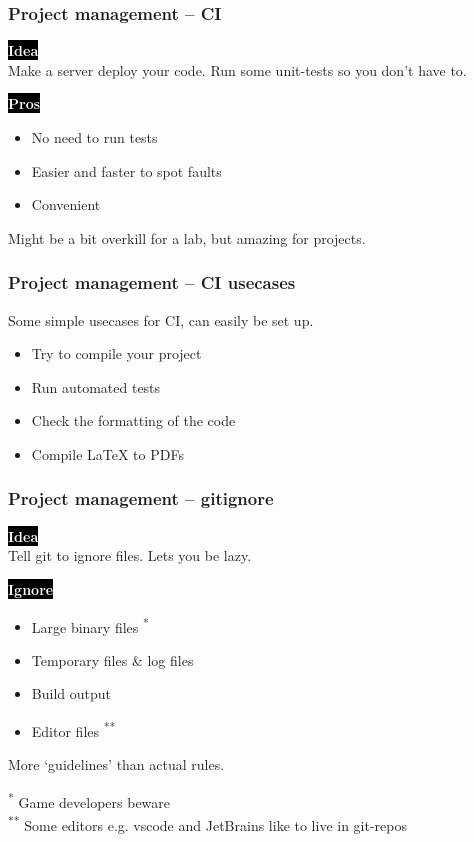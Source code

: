 \documentclass{beamer}
\newcommand{\keyword}[1]{\hspace{-1.0em}\colorbox{black}{\textcolor{white}{\textbf{#1}\vphantom{Ep}}}\vspace{0.2em}} %
\begin{document}
\begin{frame}[fragile]
  \frametitle{Project management -- CI} %

  \keyword{Idea} \\
  Make a server deploy your code. Run some unit-tests so you don't have to.
  \vspace{1em}

  \keyword{Pros}
  \begin{itemize}[<+->]
    \item No need to run tests
    \item Easier and faster to spot faults
    \item Convenient
  \end{itemize}
  \vspace{1em}

  \pause
  Might be a bit overkill for a lab, but amazing for projects.

\end{frame}

\begin{frame}[fragile]
  \frametitle{Project management -- CI usecases} %

  Some simple usecases for CI, can easily be set up.
  \vspace{1em}
  \begin{itemize}
    \item Try to compile your project
    \item Run automated tests
    \item Check the formatting of the code
    \item Compile \LaTeX{} to PDFs
  \end{itemize}

\end{frame}

\begin{frame}[fragile]
  \frametitle{Project management -- gitignore}

  \keyword{Idea} \\
  Tell git to ignore files. Lets you be lazy.
  \vspace{1em}

  \keyword{Ignore}
  \begin{itemize}[<+->]
    \item Large binary files \textsuperscript{*}
    \item Temporary files \& log files
    \item Build output
    \item Editor files \textsuperscript{**}
  \end{itemize}
  \vspace{1em}

  \pause
  More `guidelines' than actual rules.
  \vspace{1em}
  \pause

  \small \textsuperscript{*} Game developers beware \\
  \small \textsuperscript{**} Some editors e.g. vscode and JetBrains like to live in git-repos \\
\end{frame}
\end{document}
